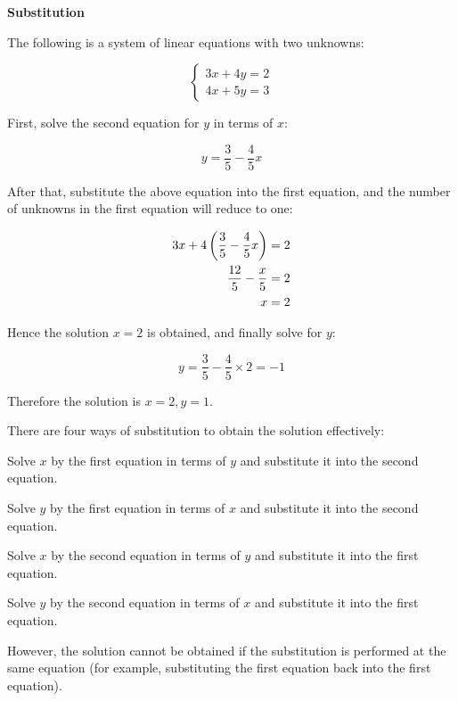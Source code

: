 \documentclass[a4paper,12pt]{article}
\begin{document}
\begin{alist}
  \item \textbf{Substitution}\n

  \begin{exm}
  The following is a system of linear equations with two unknowns:

  $$\begin{cases}
    3x+4y=2\\
    4x+5y=3
   \end{cases}$$\s

  First, solve the second equation for $y$ in terms of $x$:

  $$y=\frac{3}{5}-\frac{4}{5}x$$\s

  After that, substitute the above equation into the first equation, and the number of unknowns in the first equation will reduce to one:

  $$\begin{aligned}[t]
    3x+4\left( \frac{3}{5}-\frac{4}{5}x\right)&=2\\
    \frac{12}{5}-\frac{x}{5}&=2\\
    x&=2
   \end{aligned}$$\s

  Hence the solution $x=2$ is obtained, and finally solve for $y$:

  $$y=\frac{3}{5}-\frac{4}{5}\times 2=-1$$\s

  Therefore the solution is $x=2,y=1$.
 \end{exm}\n

 There are four ways of substitution to obtain the solution effectively:

 \begin{nlist}
  \item Solve $x$ by the first equation in terms of $y$ and substitute it into the second equation.
  \item Solve $y$ by the first equation in terms of $x$ and substitute it into the second equation.
  \item Solve $x$ by the second equation in terms of $y$ and substitute it into the first equation.
  \item Solve $y$ by the second equation in terms of $x$ and substitute it into the first equation.
  \end{nlist}

 However, the solution cannot be obtained if the substitution is performed at the same equation (for example, substituting the first equation back into the first equation).


\end{alist}
\end{document}
